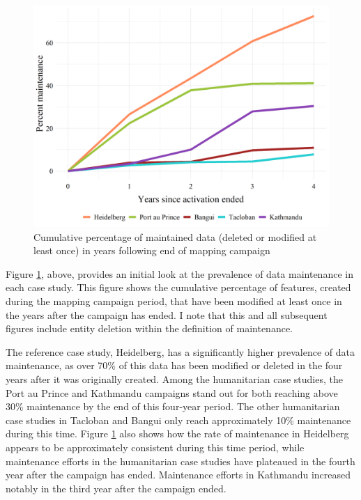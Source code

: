 \begin{figure} %
    \centering %
    \includegraphics[width = \textwidth]{Images/totmaint.png} %
    \caption[Percent of total maintained data over time.]{Cumulative percentage of maintained data (deleted or modified at least once) in years following end of mapping campaign} %
    \label{fig:tot} %
\end{figure}

Figure \ref{fig:tot}, above, provides an initial look at the prevalence of data maintenance in each case study. This figure shows the cumulative percentage of features, created during the mapping campaign period, that have been modified at least once in the years after the campaign has ended. I note that this and all subsequent figures include entity deletion within the definition of maintenance. 

The reference case study, Heidelberg, has a significantly higher prevalence of data maintenance, as over 70\% of this data has been modified or deleted in the four years after it was originally created. Among the humanitarian case studies, the Port au Prince and Kathmandu campaigns stand out for both reaching above 30\% maintenance by the end of this four-year period. The other humanitarian case studies in Tacloban and Bangui only reach approximately 10\% maintenance during this time. Figure \ref{fig:tot} also shows how the rate of maintenance in Heidelberg appears to be approximately consistent during this time period, while maintenance efforts in the humanitarian case studies have plateaued in the fourth year after the campaign has ended. Maintenance efforts in Kathmandu increased notably in the third year after the campaign ended.


